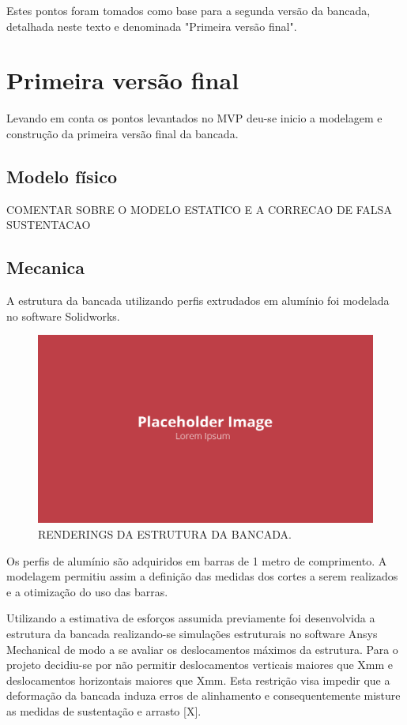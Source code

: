 Estes pontos foram tomados como base para a segunda versão da bancada, detalhada neste texto e denominada "Primeira versão final".

\section{Primeira versão final}

Levando em conta os pontos levantados no MVP deu-se inicio a modelagem e construção da primeira versão final da bancada.

\subsection{Modelo físico}

COMENTAR SOBRE O MODELO ESTATICO E A CORRECAO DE FALSA SUSTENTACAO

\subsection{Mecanica}

A estrutura da bancada utilizando perfis extrudados em alumínio foi modelada no software Solidworks.

\begin{figure}[!ht]
    \centering
    \includegraphics[width=.8\linewidth]{figuras/outras/placeholder.png}
    \caption{RENDERINGS DA ESTRUTURA DA BANCADA\cite{autor}.}
    \label{fig:estrutura_bancada}
\end{figure}

Os perfis de alumínio são adquiridos em barras de 1 metro de comprimento. A modelagem permitiu assim a definição das medidas dos cortes a serem realizados e a otimização do uso das barras.

Utilizando a estimativa de esforços assumida previamente foi desenvolvida a estrutura da bancada realizando-se simulações estruturais no software Ansys Mechanical de modo a se avaliar os deslocamentos máximos da estrutura. Para o projeto decidiu-se por não permitir deslocamentos verticais maiores que Xmm e deslocamentos horizontais maiores que Xmm. Esta restrição visa impedir que a deformação da bancada induza erros de alinhamento e consequentemente misture as medidas de sustentação e arrasto [X].

